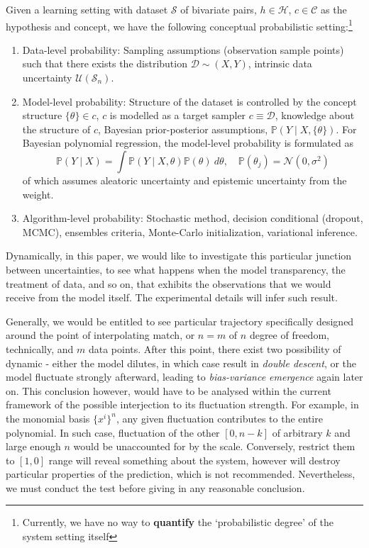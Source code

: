 \begin{conjecture}
    Given a learning setting with dataset $\mathcal{S}$ of bivariate pairs, $h\in \mathcal{H}$, $c\in \mathcal{C}$ as the hypothesis and concept, we have the following conceptual probabilistic setting:\footnote{Currently, we have no way to \textbf{quantify} the `probabilistic degree' of the system setting itself}
    \begin{enumerate}
        \item Data-level probability: Sampling assumptions (observation sample points) such that there exists the distribution $\mathcal{D}\sim (X,Y)$, intrinsic data uncertainty $\mathcal{U}(\mathcal{S}_{n})$. 
        \item Model-level probability: Structure of the dataset is controlled by the concept structure $\{\theta\}\in c$, $c$ is modelled as a target sampler $c\equiv \mathcal{D}$, knowledge about the structure of $c$, Bayesian prior-posterior assumptions, $\mathbb{P}(Y\mid X, \{\theta\})$. For Bayesian polynomial regression, the model-level probability is formulated as \begin{equation}
            \mathbb{P}(Y\mid X) = \int \mathbb{P}(Y\mid X,\theta)\mathbb{P}(\theta)\: d\theta, \quad \mathbb{P}(\theta_{j}) = \mathcal{N}(0,\sigma^{2})
        \end{equation}
        of which assumes aleatoric uncertainty and epistemic uncertainty from the weight. 
        \item Algorithm-level probability: Stochastic method, decision conditional (dropout, MCMC), ensembles criteria, Monte-Carlo initialization, variational inference. 
    \end{enumerate}
\end{conjecture}

Dynamically, in this paper, we would like to investigate this particular junction between uncertainties, to see what happens when the model transparency, the treatment of data, and so on, that exhibits the observations that we would receive from the model itself. The experimental details will infer such result. 

Generally, we would be entitled to see particular trajectory specifically designed around the point of interpolating match, or $n=m$ of $n$ degree of freedom, technically, and $m$ data points. After this point, there exist two possibility of dynamic - either the model dilutes, in which case result in \textit{double descent}, or the model fluctuate strongly afterward, leading to \textit{bias-variance emergence} again later on. This conclusion however, would have to be analysed within the current framework of the possible interjection to its fluctuation strength. For example, in the monomial basis $\{x^{i}\}^{n}$, any given fluctuation contributes to the entire polynomial. In such case, fluctuation of the other $[0,n-k]$ of arbitrary $k$ and large enough $n$ would be unaccounted for by the scale. Conversely, restrict them to $[1,0]$ range will reveal something about the system, however will destroy particular properties of the prediction, which is not recommended. Nevertheless, we must conduct the test before giving in any reasonable conclusion.

